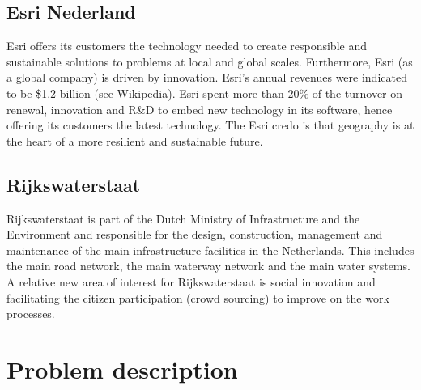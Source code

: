 \documentclass[a4paper,11pt]{article}
\begin{document}
\subsection*{Esri Nederland}

Esri offers its customers the technology needed 
to create responsible and sustainable solutions to 
problems at local and global scales. 
Furthermore, Esri (as a global company) is driven by innovation.
Esri's annual revenues were indicated to be \$1.2 billion (see Wikipedia).
Esri spent more than 20\% of the turnover on renewal, innovation and R\&D to embed new technology in its 
software, hence offering its customers the latest technology.
The Esri credo is that geography is at the heart of a more resilient and sustainable future.

\subsection*{Rijkswaterstaat}

Rijkswaterstaat is part of the Dutch Ministry of Infrastructure and the Environment and responsible 
for the design, construction, management and maintenance of the main infrastructure 
facilities in the Netherlands. This includes the main road network, the main waterway 
network and the main water systems.
A relative new area of interest for Rijkswaterstaat is social innovation and facilitating
the citizen participation (crowd sourcing) to improve on the 
work processes.

\section{Problem description}
\end{document}
